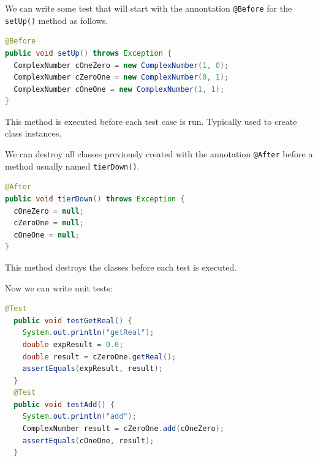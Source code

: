 \documentclass[11pt, xcolor=svgnames]{beamer}
\begin{document}

\begin{frame}[fragile]

We can write some test that will start with the annontation \texttt{@Before} for the \texttt{setUp()} method as follows.

\begin{lstlisting}[language=Java,basicstyle=\tiny]
@Before
public void setUp() throws Exception {
  ComplexNumber cOneZero = new ComplexNumber(1, 0);
  ComplexNumber cZeroOne = new ComplexNumber(0, 1);
  ComplexNumber cOneOne = new ComplexNumber(1, 1);
}
\end{lstlisting}	
This method is executed before each test case is run. Typically used to create class instances.
\end{frame}


\begin{frame}[fragile]

We can destroy all classes previously created with the annotation  \texttt{@After} before a method usually named \texttt{tierDown()}.

\begin{lstlisting}[language=Java,basicstyle=\tiny]
@After
public void tierDown() throws Exception {
  cOneZero = null;
  cZeroOne = null;
  cOneOne = null;
}
\end{lstlisting}

This method destroys the classes before each test is executed.

\end{frame}


\begin{frame}[fragile]
Now we can write unit tests:

\begin{lstlisting}[language=Java,basicstyle=\tiny]
  @Test  
  public void testGetReal() {
    System.out.println("getReal");
    double expResult = 0.0;
    double result = cZeroOne.getReal();
    assertEquals(expResult, result);
  }
  @Test
  public void testAdd() {
    System.out.println("add");
    ComplexNumber result = cZeroOne.add(cOneZero);
    assertEquals(cOneOne, result);
  }
\end{lstlisting}
\end{frame}
\end{document}
